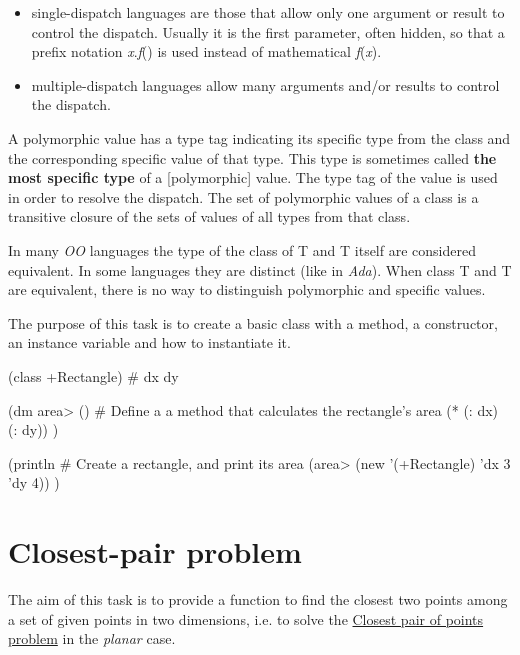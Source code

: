 \begin{itemize}
\item
  single-dispatch languages are those that allow only one argument or
  result to control the dispatch. Usually it is the first parameter,
  often hidden, so that a prefix notation \emph{x}.\emph{f}() is used
  instead of mathematical \emph{f}(\emph{x}).
\item
  multiple-dispatch languages allow many arguments and/or results to
  control the dispatch.
\end{itemize}

A polymorphic value has a type tag indicating its specific type from the
class and the corresponding specific value of that type. This type is
sometimes called \textbf{the most specific type} of a {[}polymorphic{]}
value. The type tag of the value is used in order to resolve the
dispatch. The set of polymorphic values of a class is a transitive
closure of the sets of values of all types from that class.

In many \emph{OO} languages the type of the class of T and T itself
are considered equivalent. In some languages they are distinct (like
in \emph{Ada}). When class T and T are equivalent, there is no way to
distinguish polymorphic and specific values.

The purpose of this task is to create a basic class with a method, a
constructor, an instance variable and how to instantiate it.


\begin{wideverbatim}

(class +Rectangle)
# dx dy

(dm area> ()  # Define a a method that calculates the rectangle's area
   (* (: dx) (: dy)) )

(println  # Create a rectangle, and print its area
   (area> (new '(+Rectangle) 'dx 3 'dy 4)) )

\end{wideverbatim}

\pagebreak{}
\section*{Closest-pair problem}

The aim of this task is to provide a function to find the closest two
points among a set of given points in two dimensions, i.e. to solve the
\href{http://en.wikipedia.org/wiki/Closest\_pair\_of\_points\_problem}{Closest
pair of points problem} in the \emph{planar} case.

